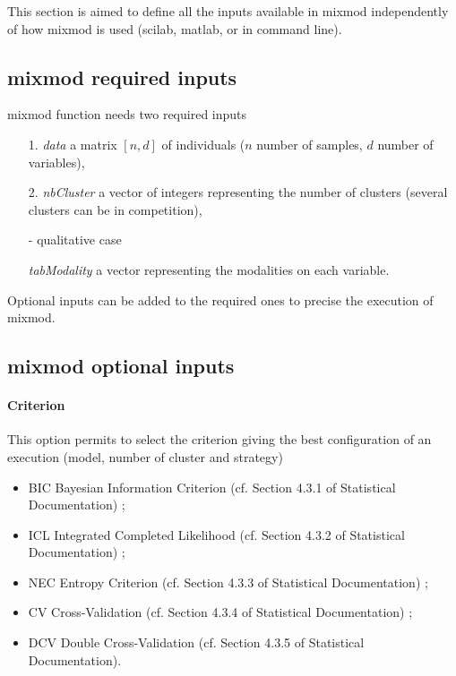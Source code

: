 This section is aimed to define all the inputs available in {\sc mixmod}
independently of how {\sc mixmod} is used (scilab, matlab, or in command line).





\subsection{{\sc mixmod} required inputs}
\label{input_option}

{\sc mixmod} function needs two required inputs
\begin{itemize}
 \item[1.] {\it data} a matrix $[n,d]$ of individuals ($n$ number of samples, $d$ number of variables),
 \item[2.] {\it nbCluster} a vector of integers representing the number of clusters
                             (several clusters can be in competition),
 \item[-] qualitative case

{\it tabModality} a vector representing the modalities on each variable.


\end{itemize}



Optional inputs can be added to the required ones to precise the execution of {\sc mixmod}.

\subsection{{\sc mixmod} optional inputs}
 \paragraph{Criterion} This option permits to select the criterion giving the best configuration
                         of an execution (model, number of cluster and strategy)
    \begin{itemize}
     \item BIC Bayesian Information Criterion (cf. Section 4.3.1 of Statistical Documentation) ;
     \item ICL Integrated Completed Likelihood (cf. Section 4.3.2 of Statistical Documentation) ;
     \item NEC Entropy Criterion (cf. Section 4.3.3 of Statistical Documentation) ;
     \item CV Cross-Validation (cf. Section 4.3.4 of Statistical Documentation) ;
     \item DCV Double Cross-Validation (cf. Section 4.3.5 of Statistical Documentation).
    \end{itemize}


